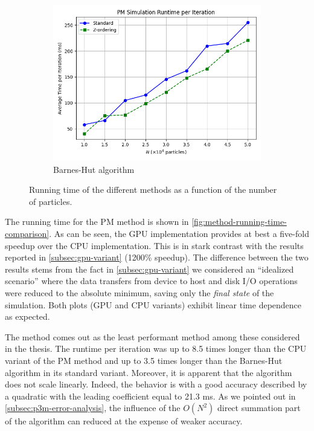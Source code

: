 \begin{figure}[!ht]
    \vspace{1em}

    \begin{subfigure}[b]{0.48\textwidth}
        \centering
        \includegraphics[width=\linewidth]{chapters/results/img/perf/bh_time.png}
        \caption{Barnes-Hut algorithm}
        \label{fig:bh-running-time}
    \end{subfigure}

    \caption{Running time of the different methods as a function of the number of particles.}
    \label{fig:method-running-time-comparison}
\end{figure}

The running time for the PM method is shown in \autoref{fig:method-running-time-comparison}.
As can be seen, the GPU implementation provides at best a five-fold speedup over the CPU implementation.
This is in stark contrast with the results reported in \autoref{subsec:gpu-variant} (1200\% speedup).
The difference between the two results stems from the fact in \autoref{subsec:gpu-variant} we considered an ``idealized scenario'' where the data transfers from device to host and disk I/O operations were reduced to the absolute minimum, saving only the \textit{final state} of the simulation.
Both plots (GPU and CPU variants) exhibit linear time dependence as expected.

The \PThreeM{} method comes out as the least performant method among these considered in the thesis.
The runtime per iteration was up to 8.5 times longer than the CPU variant of the PM method and up to 3.5 times longer than the Barnes-Hut algorithm in its standard variant.
Moreover, it is apparent that the algorithm does not scale linearly.
Indeed, the behavior is with a good accuracy described by a quadratic with the leading coefficient equal to 21.3 ms.
As we pointed out in \autoref{subsec:p3m-error-analysis}, the influence of the $O(N^2)$ direct summation part of the algorithm can reduced at the expense of weaker accuracy.

